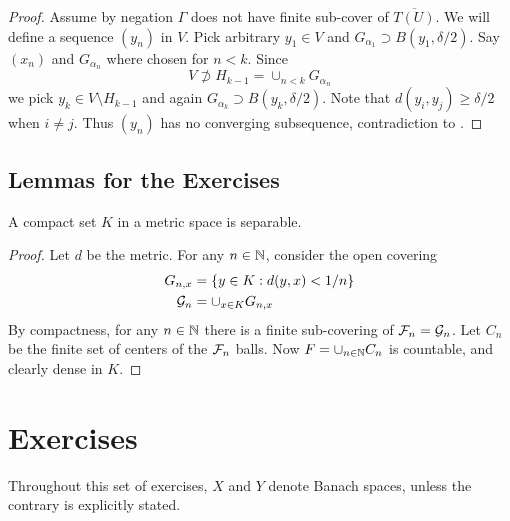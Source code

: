 \begin{proof}
Assume by negation \(\Gamma\) does not have finite sub-cover
 of \(\overline{T(U)}\). We will define a sequence \((y_n)\) in $V$.
Pick arbitrary \(y_1\in V\) and \(G_{\alpha_1} \supset
 B(y_1, \delta/2)\).
Say \((x_n)\) and \(G_{\alpha_n}\) where chosen for \(n<k\).
Since 
\begin{equation*}
V \not\supset H_{k-1} = \cup_{n<k} G_{\alpha_n}
\end{equation*}
we pick \(y_k \in V \setminus H_{k-1}\)
and again \(G_{\alpha_k} \supset B(y_k, \delta/2)\).
Note that \(d(y_i,y_j)\geq \delta/2\) when \(i\neq j\).
Thus \((y_n)\) has no converging subsequence, contradiction to .
\end{proof}

\subsection{Lemmas for the Exercises}

\begin{llem} \label{lem:compact:separable}
A compact set $K$ in a metric space is separable.
\end{llem}
\begin{proof}
Let $d$ be the metric.
For any \(n\in\mathbb{N}\), consider the open covering
\begin{align*}
G_{n,x} &= \{y\in K: d(y,x) < 1/n\}\\
\mathcal{G}_n &= \cup_{x\in K} G_{n,x}
\end{align*}
By compactness, for any \(n\in\mathbb{N}\) there is a finite 
sub-covering of \(\mathcal{F}_n = \mathcal{G}_n\).
Let \(C_n\) be the finite set of centers of the \(\mathcal{F}_n\) balls.
Now \(F = \cup_{n\in\mathbb{N}} C_n\) is countable, and clearly dense in $K$.
\end{proof}

\section{Exercises} %

Throughout this set of exercises, $X$ and $Y$ denote Banach spaces, unless
the contrary is explicitly stated.

